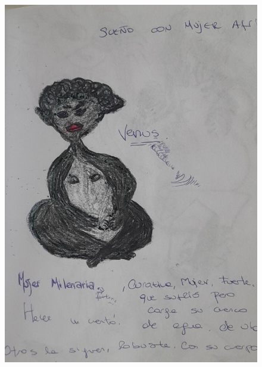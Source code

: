 \documentclass[12pt, a4paper, twoside]{book} %
\begin{document}
\begin{figure}[H]
	\centering
	\includegraphics[width=\textwidth]{./images/1f81324df27a62.jpg}
\end{figure}

\clearpage
\end{document}
